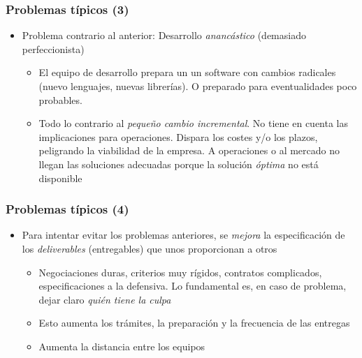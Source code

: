 \documentclass[ucs]{beamer}
\begin{document}
\begin{frame}[fragile]
\frametitle{Problemas típicos (3)}
\begin{itemize}
\item
Problema contrario al anterior: 
Desarrollo \emph{anancástico} (demasiado perfeccionista)


\begin{itemize}
\item
El equipo de desarrollo prepara un
un software con cambios radicales
(nuevo lenguajes, nuevas librerías).
O preparado para eventualidades poco probables.

\item
Todo lo contrario al \emph{pequeño cambio incremental}.
No tiene en cuenta las implicaciones para operaciones. 
Dispara los costes y/o los plazos, peligrando la viabilidad de la empresa.
A operaciones o al mercado no llegan las soluciones adecuadas
porque la solución \emph{óptima} no está disponible
\end{itemize}
\end{itemize}
\end{frame}


\begin{frame}[fragile]
\frametitle{Problemas típicos (4)}
\begin{itemize}
\item
Para intentar evitar los problemas anteriores, se 
\emph{mejora} la especificación de 
los \emph{deliverables} (entregables) que unos proporcionan
a otros


\begin{itemize}
\item
Negociaciones duras,
criterios muy rígidos, contratos
complicados, especificaciones a la defensiva.
Lo fundamental es, en caso de problema, dejar claro 
\emph{quién tiene la culpa}


\item
Esto aumenta los trámites, la preparación y la frecuencia de las entregas

\item
Aumenta la distancia entre los equipos

\end{itemize}
\end{itemize}
\end{frame}
\end{document}
